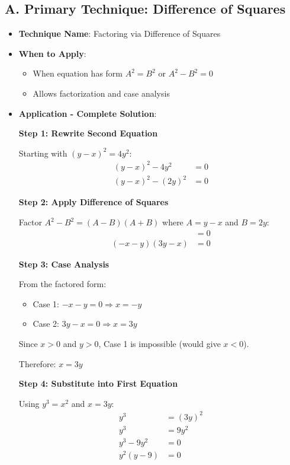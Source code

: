 \documentclass[12pt]{article}
\begin{document}
\begin{techniquesbox}
\subsection*{A. Primary Technique: Difference of Squares}
\begin{itemize}[leftmargin=*]
    \item \textbf{Technique Name}: Factoring via Difference of Squares
    \item \textbf{When to Apply}: 
    \begin{itemize}
        \item When equation has form $A^2 = B^2$ or $A^2 - B^2 = 0$
        \item Allows factorization and case analysis
    \end{itemize}
    \item \textbf{Application - Complete Solution}: 
    
    \textbf{Step 1: Rewrite Second Equation}
    
    Starting with $(y-x)^2 = 4y^2$:
    \begin{align*}
    (y-x)^2 - 4y^2 &= 0\\
    (y-x)^2 - (2y)^2 &= 0
    \end{align*}
    
    \textbf{Step 2: Apply Difference of Squares}
    
    Factor $A^2 - B^2 = (A-B)(A+B)$ where $A = y-x$ and $B = 2y$:
    \begin{align*}
    [(y-x) - 2y][(y-x) + 2y] &= 0\\
    (-x - y)(3y - x) &= 0
    \end{align*}
    
    \textbf{Step 3: Case Analysis}
    
    From the factored form:
    \begin{itemize}
        \item Case 1: $-x - y = 0 \Rightarrow x = -y$
        \item Case 2: $3y - x = 0 \Rightarrow x = 3y$
    \end{itemize}
    
    Since $x > 0$ and $y > 0$, Case 1 is impossible (would give $x < 0$).
    
    Therefore: $x = 3y$
    
    \textbf{Step 4: Substitute into First Equation}
    
    Using $y^3 = x^2$ and $x = 3y$:
    \begin{align*}
    y^3 &= (3y)^2\\
    y^3 &= 9y^2\\
    y^3 - 9y^2 &= 0\\
    y^2(y - 9) &= 0
    \end{align*}
    

\end{itemize}
\end{techniquesbox}
\end{document}

